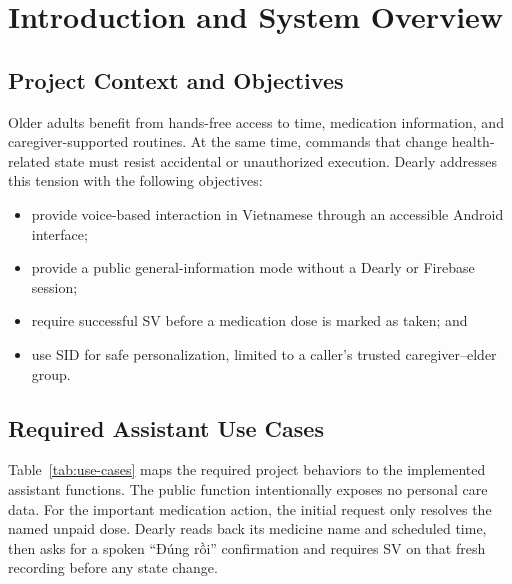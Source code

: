 
\section{Introduction and System Overview}

\subsection{Project Context and Objectives}
Older adults benefit from hands-free access to time, medication information, and caregiver-supported routines. At the same time, commands that change health-related state must resist accidental or unauthorized execution. Dearly addresses this tension with the following objectives:
\begin{itemize}
    \item provide voice-based interaction in Vietnamese through an accessible Android interface;
    \item provide a public general-information mode without a Dearly or Firebase session;
    \item require successful SV before a medication dose is marked as taken; and
    \item use SID for safe personalization, limited to a caller's trusted caregiver--elder group.
\end{itemize}

\subsection{Required Assistant Use Cases}
Table~\ref{tab:use-cases} maps the required project behaviors to the implemented assistant functions. The public function intentionally exposes no personal care data. For the important medication action, the initial request only resolves the named unpaid dose. Dearly reads back its medicine name and scheduled time, then asks for a spoken ``Đúng rồi'' confirmation and requires SV on that fresh recording before any state change.

